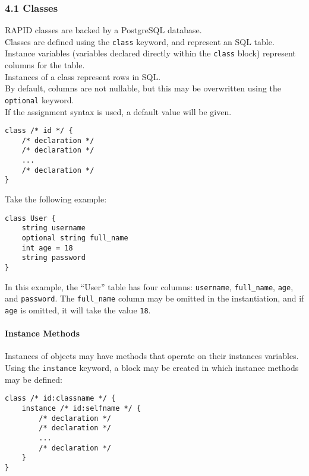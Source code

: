 \documentclass[]{article}
\begin{document}
\subsubsection{4.1 Classes}\label{classes}

RAPID classes are backed by a PostgreSQL database.\\Classes are defined
using the \texttt{class} keyword, and represent an SQL table.\\Instance
variables (variables declared directly within the \texttt{class} block)
represent columns for the table.\\Instances of a class represent rows in
SQL.\\By default, columns are not nullable, but this may be overwritten
using the \texttt{optional} keyword.\\If the assignment syntax is used,
a default value will be given.

\begin{verbatim}
class /* id */ {
    /* declaration */
    /* declaration */
    ...
    /* declaration */
}
\end{verbatim}

Take the following example:

\begin{verbatim}
class User {
    string username
    optional string full_name
    int age = 18
    string password
}
\end{verbatim}

In this example, the ``User'' table has four columns: \texttt{username},
\texttt{full\_name}, \texttt{age}, and \texttt{password}. The
\texttt{full\_name} column may be omitted in the instantiation, and if
\texttt{age} is omitted, it will take the value \texttt{18}.

\paragraph{Instance Methods}\label{instance-methods}

Instances of objects may have methods that operate on their instances
variables. Using the \texttt{instance} keyword, a block may be created
in which instance methods may be defined:

\begin{verbatim}
class /* id:classname */ {
    instance /* id:selfname */ {
        /* declaration */
        /* declaration */
        ...
        /* declaration */
    }
}
\end{verbatim}
\end{document}
